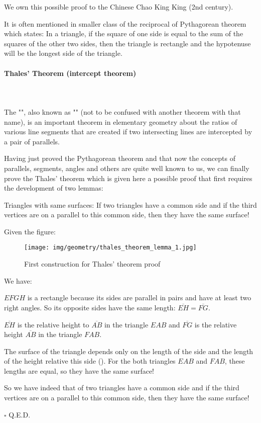 	\begin{tcolorbox}[title=Remark,colframe=black,arc=10pt]
	We own this possible proof to the Chinese Chao King King (2nd century).
	\end{tcolorbox}
	It is often mentioned in smaller class of the reciprocal of Pythagorean theorem which states: In a triangle, if the square of one side is equal to the sum of the squares of the other two sides, then the triangle is rectangle and the hypotenuse will be the longest side of the triangle.
	
	\paragraph{Thales' Theorem (intercept theorem)}\mbox{}\\\\
	The "", also known as "\label{thales theorem}" (not to be confused with another theorem with that name), is an important theorem in elementary geometry about the ratios of various line segments that are created if two intersecting lines are intercepted by a pair of parallels.
	
	Having just proved the Pythagorean theorem and that now the concepts of parallels, segments, angles and others are quite well known to us, we can finally prove the Thales' theorem which is given here a possible proof that first requires the development of two lemmas:
	\begin{lemma}
	 Triangles with same surfaces: If two triangles have a common side and if the third vertices are on a parallel to this common side, then they have the same surface!
	\end{lemma}
	\begin{dem}
	Given the figure:
	\begin{figure}[H]
		\centering
		\texttt{[image: img/geometry/thales\_theorem\_lemma\_1.jpg]}
		\caption[]{First construction for Thales' theorem proof}
	\end{figure}
	We have:
	
	$EFGH$ is a rectangle because its sides are parallel in pairs and have at least two right angles. So its opposite sides have the same length: $\overline{EH} = \overline{FG}$.
	
	$\overline{EH}$ is the relative height to $\overline{AB}$ in the triangle $EAB$ and $\overline{FG}$ is the relative height $\overline{AB}$ in the triangle $FAB$.
	
	The surface of the triangle depends only on the length of the side and the length of the height relative this side (). For the both triangles $EAB$ and $FAB$, these lengths are equal, so they have the same surface!
	
	So we have indeed that of two triangles have a common side and if the third vertices are on a parallel to this common side, then they have the same surface!
	\begin{flushright}
		$\square$  Q.E.D.
	\end{flushright}
	\end{dem}
	
